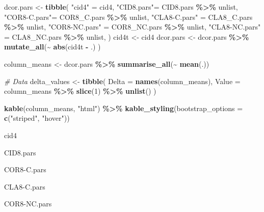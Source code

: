 \documentclass[
]{article}
\newenvironment{Shaded}{\begin{snugshade}}{\end{snugshade}}
\newcommand{\AttributeTok}[1]{\textcolor[rgb]{0.13,0.29,0.53}{#1}}
\newcommand{\CommentTok}[1]{\textcolor[rgb]{0.56,0.35,0.01}{\textit{#1}}}
\newcommand{\DecValTok}[1]{\textcolor[rgb]{0.00,0.00,0.81}{#1}}
\newcommand{\FunctionTok}[1]{\textcolor[rgb]{0.13,0.29,0.53}{\textbf{#1}}}
\newcommand{\NormalTok}[1]{#1}
\newcommand{\OtherTok}[1]{\textcolor[rgb]{0.56,0.35,0.01}{#1}}
\newcommand{\SpecialCharTok}[1]{\textcolor[rgb]{0.81,0.36,0.00}{\textbf{#1}}}
\newcommand{\StringTok}[1]{\textcolor[rgb]{0.31,0.60,0.02}{#1}}
\begin{document}
\begin{Shaded}
\begin{Highlighting}[]
\NormalTok{dcor.pars }\OtherTok{\textless{}{-}} \FunctionTok{tibble}\NormalTok{(}
\StringTok{"cid4"} \OtherTok{=}\NormalTok{ cid4,}
\StringTok{"CID8.pars"}\OtherTok{=}\NormalTok{ CID8.pars }\SpecialCharTok{\%\textgreater{}\%}\NormalTok{ unlist,}
\StringTok{"COR8{-}C.pars"}\OtherTok{=}\NormalTok{ COR8\_C.pars }\SpecialCharTok{\%\textgreater{}\%}\NormalTok{ unlist,}
\StringTok{"CLA8{-}C.pars"} \OtherTok{=}\NormalTok{ CLA8\_C.pars }\SpecialCharTok{\%\textgreater{}\%}\NormalTok{ unlist,}
\StringTok{"COR8{-}NC.pars"} \OtherTok{=}\NormalTok{ COR8\_NC.pars }\SpecialCharTok{\%\textgreater{}\%}\NormalTok{ unlist,}
\StringTok{"CLA8{-}NC.pars"} \OtherTok{=}\NormalTok{ CLA8\_NC.pars }\SpecialCharTok{\%\textgreater{}\%}\NormalTok{ unlist,}
\NormalTok{)}
\NormalTok{cid4t }\OtherTok{\textless{}{-}}\NormalTok{ cid4}
\NormalTok{dcor.pars }\OtherTok{\textless{}{-}}\NormalTok{ dcor.pars }\SpecialCharTok{\%\textgreater{}\%}
  \FunctionTok{mutate\_all}\NormalTok{(}\SpecialCharTok{\textasciitilde{}} \FunctionTok{abs}\NormalTok{(cid4t }\SpecialCharTok{{-}}\NormalTok{ .) )}

\NormalTok{column\_means }\OtherTok{\textless{}{-}}\NormalTok{ dcor.pars }\SpecialCharTok{\%\textgreater{}\%}
  \FunctionTok{summarise\_all}\NormalTok{(}\SpecialCharTok{\textasciitilde{}} \FunctionTok{mean}\NormalTok{(.))}

\CommentTok{\# Data}
\NormalTok{delta\_values }\OtherTok{\textless{}{-}} \FunctionTok{tibble}\NormalTok{(}
  \AttributeTok{Delta =} \FunctionTok{names}\NormalTok{(column\_means),}
  \AttributeTok{Value =}\NormalTok{ column\_means }\SpecialCharTok{\%\textgreater{}\%} \FunctionTok{slice}\NormalTok{(}\DecValTok{1}\NormalTok{) }\SpecialCharTok{\%\textgreater{}\%} \FunctionTok{unlist}\NormalTok{()}
\NormalTok{)}

\FunctionTok{kable}\NormalTok{(column\_means, }\StringTok{"html"}\NormalTok{) }\SpecialCharTok{\%\textgreater{}\%}
  \FunctionTok{kable\_styling}\NormalTok{(}\AttributeTok{bootstrap\_options =} \FunctionTok{c}\NormalTok{(}\StringTok{"striped"}\NormalTok{, }\StringTok{"hover"}\NormalTok{))}
\end{Highlighting}
\end{Shaded}

cid4

CID8.pars

COR8-C.pars

CLA8-C.pars

COR8-NC.pars
\end{document}
